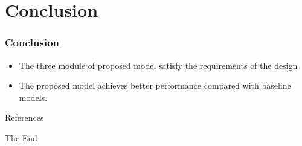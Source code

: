 \documentclass{beamer}
\begin{document}
\section{Conclusion}
\begin{frame}
  \frametitle{Conclusion}
  \begin{itemize}
    \item The three module of proposed model satisfy the requirements of the design
    \item The proposed model achieves better performance compared with baseline models.
  \end{itemize}
\end{frame}


\begin{frame}[allowframebreaks]{References}
  
  
\end{frame}


\begin{frame}
  \Huge{\centerline{The End}}
\end{frame}

\end{document}
